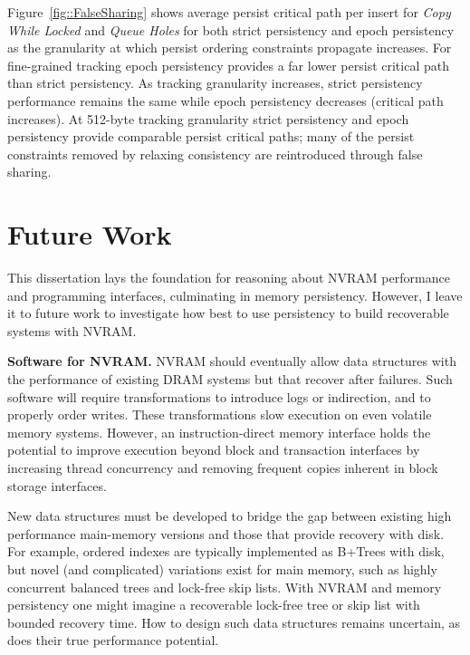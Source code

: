  

Figure~\ref{fig::FalseSharing} shows average persist critical path per insert for \emph{Copy While Locked} and \emph{Queue Holes} for both strict persistency and epoch persistency as the granularity at which persist ordering constraints propagate increases.
For fine-grained tracking epoch persistency provides a far lower persist critical path than strict persistency.
As tracking granularity increases, strict persistency performance remains the same while epoch persistency decreases (critical path increases).
At 512-byte tracking granularity strict persistency and epoch persistency provide comparable persist critical paths; many of the persist constraints removed by relaxing consistency are reintroduced through false sharing.

\section{Future Work}
\label{sec:PersistencyEval:FutureWork}

This dissertation lays the foundation for reasoning about NVRAM performance and programming interfaces, culminating in memory persistency.
However, I leave it to future work to investigate how best to use persistency to build recoverable systems with NVRAM.

\textbf{Software for NVRAM.}
NVRAM should eventually allow data structures with the performance of existing DRAM systems but that recover after failures.
Such software will require transformations to introduce logs or indirection, and to properly order writes.
These transformations slow execution on even volatile memory systems.
However, an instruction-direct memory interface holds the potential to improve execution beyond block and transaction interfaces by increasing thread concurrency and removing frequent copies inherent in block storage interfaces.

New data structures must be developed to bridge the gap between existing high performance main-memory versions and those that provide recovery with disk.
For example, ordered indexes are typically implemented as B+Trees with disk, but novel (and complicated) variations exist for main memory, such as highly concurrent balanced trees and lock-free skip lists.
With NVRAM and memory persistency one might imagine a recoverable lock-free tree or skip list with bounded recovery time.
How to design such data structures remains uncertain, as does their true performance potential.

